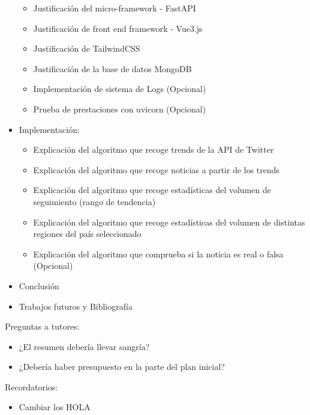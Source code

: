 \begin{itemize}
\begin{itemize}
    \item Justificación del micro-framework - FastAPI
    \item Justificación de front end framework - Vue3.js
    \item Justificación de TailwindCSS
    \item Justificación de la base de datos MongoDB
    \item Implementación de sistema de Logs (Opcional)
    \item Prueba de prestaciones con uvicorn (Opcional)
\end{itemize}
\item Implementación:
\begin{itemize}
    \item Explicación del algoritmo que recoge trends de la API de Twitter
    \item Explicación del algoritmo que recoge noticias a partir de los trends
    \item Explicación del algoritmo que recoge estadísticas del volumen de seguimiento (rango de tendencia)
    \item Explicación del algoritmo que recoge estadísticas del volumen de distintas regiones del país seleccionado
    \item Explicación del algoritmo que comprueba si la noticia es real o falsa (Opcional)
\end{itemize}
    \item Conclusión
    \item Trabajos futuros y Bibliografía
\end{itemize}
Preguntas a tutores:
\begin{itemize}
    \item ¿El resumen debería llevar sangría?
    \item ¿Debería haber presupuesto en la parte del plan inicial?
\end{itemize}
Recordatorios:
\begin{itemize}
    \item Cambiar los HOLA
\end{itemize}

